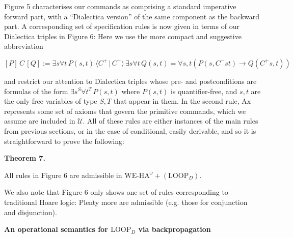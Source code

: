 \documentclass[10pt,a4paper]{article}
\begin{document}
Figure 5 characterises our commands as comprising a standard imperative forward part, with a “Dialectica version” of the same component as the backward part. A corresponding set of specification rules is now given in terms of our Dialectica triples in Figure 6: Here we use the more compact and suggestive abbreviation\par
  
\par  \quad  \[[{P}]\,{C}\,[{Q}]:={\exists s\forall t\,P(s,t)}\,{\langle{C^{+}}\,|\,{C^{-}}\rangle}\,{\exists s\forall t\,Q(s,t)}=\forall s,t\left(P(s,C^{-}st)\to Q(C^{+}s,t)\right)\]\quad  \quad  
  
and restrict our attention to Dialectica triples whose pre- and postconditions are formulas of the form $\exists s^{S}\forall t^{T}\,P(s,t)$ where $P(s,t)$ is quantifier-free, and $s,t$ are the only free variables of type $S,T$ that appear in them. In the second rule, $\mathrm{Ax}$ represents some set of axioms that govern the primitive commands, which we assume are included in $\mathcal{U}$. All of these rules are either instances of the main rules from previous sections, or in the case of conditional, easily derivable, and so it is straightforward to prove the following:\par
 
 
 
\par\medskip\noindent\textbf{Theorem 7.}\par
 
 
All rules in Figure 6 are admissible in $\mathrm{WE}\mbox{-}\mathrm{HA}^{\omega}+(\mathrm{LOOP}_{D})$.\par
 
 
 
 
We also note that Figure 6 only shows one set of rules corresponding to traditional Hoare logic: Plenty more are admissible (e.g. those for conjunction and disjunction).\par
 
 
 
\par\medskip\noindent\textbf{An operational semantics for $\mathrm{LOOP}_{D}$ via backpropagation}\par
 
\end{document}
